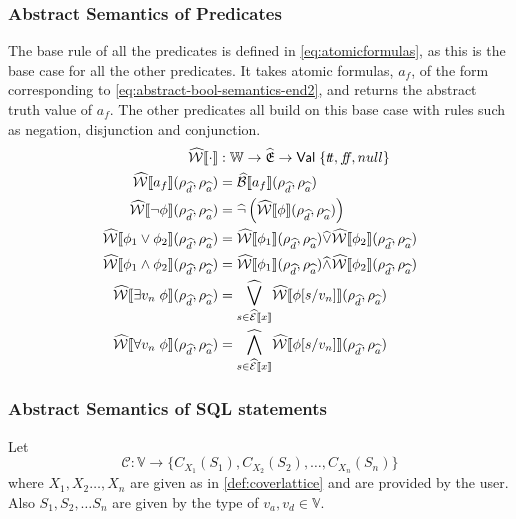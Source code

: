 \subsubsection{Abstract Semantics of Predicates}
The base rule of all the predicates is defined in \autoref{eq:atomicformulas}, as this is the base case for all the other predicates.
It takes atomic formulas, $a_f$, of the form corresponding to \autoref{eq:abstract-bool-semantics-end2}, and returns the abstract truth value of $a_f$.
The other predicates all build on this base case with rules such as negation, disjunction and conjunction.
\begin{align}\label{eq:atomicformulas}
    \abspredsem{\cdot} &: \mathbb{W} \rightarrow \ab{\mathfrak{E}} \rightarrow \mathsf{Val} \; \{\true, \false, \mnull\} \\
    \abspredsem{a_f}(\rho_{\ab{d}}, \rho_{\ab{a}}) &= \absboolsem{a_f}(\rho_{\ab{d}}, \rho_{\ab{a}}) \\
    \abspredsem{\neg \phi}(\rho_{\ab{d}}, \rho_{\ab{a}}) &= \ab{\neg} \left( \abspredsem{\phi}(\rho_{\ab{d}}, \rho_{\ab{a}}) \right) \\
    \abspredsem{\phi_1 \lor \phi_2}(\rho_{\ab{d}}, \rho_{\ab{a}}) &= \abspredsem{\phi_1}(\rho_{\ab{d}}, \rho_{\ab{a}}) \ab{\lor} \abspredsem{\phi_2}(\rho_{\ab{d}}, \rho_{\ab{a}}) \\
    \abspredsem{\phi_1 \land \phi_2}(\rho_{\ab{d}}, \rho_{\ab{a}}) &= \abspredsem{\phi_1}(\rho_{\ab{d}}, \rho_{\ab{a}}) \ab{\land} \abspredsem{\phi_2}(\rho_{\ab{d}}, \rho_{\ab{a}}) \\
    \abspredsem{\exists v_n \; \phi}(\rho_{\ab{d}}, \rho_{\ab{a}}) &= \underset{s \in \absexpsem{x}}{\ab{\bigvee}} \abspredsem{\phi[s/v_n]}(\rho_{\ab{d}}, \rho_{\ab{a}}) \\
    \abspredsem{\forall v_n \; \phi}(\rho_{\ab{d}}, \rho_{\ab{a}}) &= \underset{s \in \absexpsem{x}}{\ab{\bigwedge}} \abspredsem{\phi[s/v_n]}(\rho_{\ab{d}}, \rho_{\ab{a}})
\end{align}

\subsubsection{Abstract Semantics of SQL statements}

Let
\begin{equation}
    \mathcal{C} : \mathbb{V} \rightarrow \{ C_{X_1}(S_1), C_{X_2}(S_2), \dots, C_{X_n}(S_n) \}
\end{equation}
where $X_1, X_2 \dots ,X_n$ are given as in \autoref{def:coverlattice} and are provided by the user.
Also $S_1, S_2, \dots S_n$ are given by the type of $v_a, v_d \in \mathbb{V}$.

